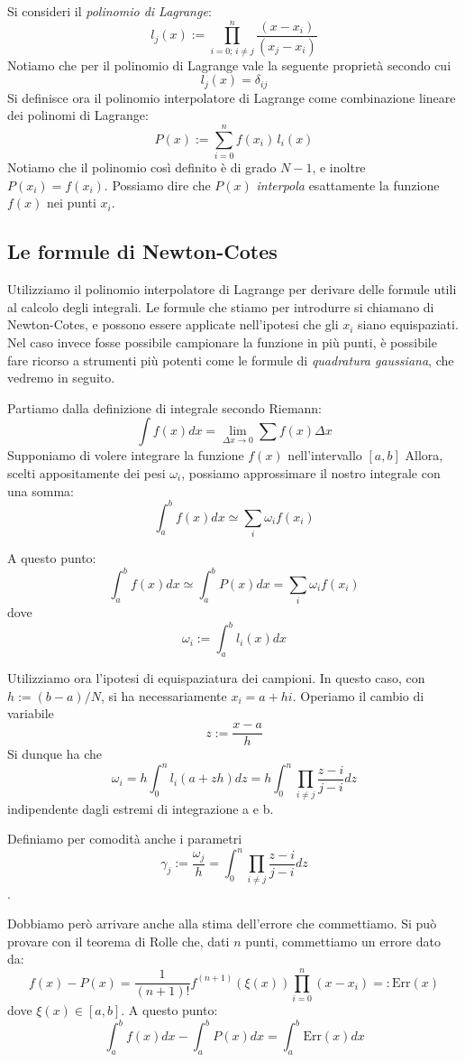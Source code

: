 \documentclass[a4paper,10pt]{article}
\begin{document}
Si consideri il \emph{polinomio di Lagrange}:
$$l_j(x):=\displaystyle\prod_{i=0;\, i\neq j}^n \dfrac{(x-x_i)}{(x_j-x_i)}$$
Notiamo che per il polinomio di Lagrange vale la seguente proprietà secondo cui
$$l_j(x) = \delta_{ij}$$
Si definisce ora il polinomio interpolatore di Lagrange come combinazione lineare dei polinomi di Lagrange:
$$P(x):= \sum_{i=0}^{n}f(x_i)\,l_i(x)$$
Notiamo che il polinomio così definito è di grado $N-1$, e inoltre $P(x_i) = f(x_i)$. Possiamo dire che $P(x)$ \emph{interpola} esattamente la funzione $f(x)$ nei punti $x_i$.

\subsection{Le formule di Newton-Cotes}
Utilizziamo il polinomio interpolatore di Lagrange per derivare delle formule utili al calcolo degli integrali. Le formule che stiamo per introdurre si chiamano di Newton-Cotes, e possono essere applicate nell'ipotesi che gli $x_i$ siano equispaziati.
Nel caso invece fosse possibile campionare la funzione in più punti, è possibile fare ricorso a strumenti più potenti come le formule di \emph{quadratura gaussiana}, che vedremo in seguito.

Partiamo dalla definizione di integrale secondo Riemann:
$$\int f(x)dx = \lim_{\Delta x \to 0} \sum f(x)\Delta x$$
Supponiamo di volere integrare la funzione $f(x)$ nell'intervallo $[a,b]$
Allora, scelti appositamente dei pesi $\omega_i$, possiamo approssimare il nostro integrale con una somma:
$$\int_a^bf(x)dx \simeq \sum_i \omega_i f(x_i)$$

A questo punto:
$$\int_a^bf(x)dx \simeq \int_a^b P(x) dx = \sum_i \omega_i f(x_i)$$
dove
$$\omega_i := \int_a^b l_i(x) dx $$

Utilizziamo ora l'ipotesi di equispaziatura dei campioni. In questo caso, con $h:=(b-a)/N$, si ha necessariamente $x_i = a+hi$. Operiamo il cambio di variabile
$$z:=\frac{x-a}{h}$$
Si dunque ha che
$$\omega_i = h\int_0^n l_i(a+zh)dz = h\int_0^n \prod_{i\neq j}\frac{z-i}{j-i}dz$$
indipendente dagli estremi di integrazione a e b.

Definiamo per comodità anche i parametri $$\gamma_j := \frac{\omega_j}{h} = \int_0^n \prod_{i\neq j}\frac{z-i}{j-i}dz$$.

Dobbiamo però arrivare anche alla stima dell'errore che commettiamo.
Si può provare con il teorema di Rolle che, dati $n$ punti, commettiamo un errore dato da:
$$f(x)-P(x) = \frac{1}{(n+1)!}f^{(n+1)}\left(\xi(x)\right)\prod_{i=0}^{n}(x-x_i) =: \text{Err}(x)$$
dove $\xi(x)\in[a,b]$.
A questo punto:
$$\int_a^bf(x)dx - \int_a^b P(x) dx = \int_a^b \text{Err}(x)dx$$
\end{document}
